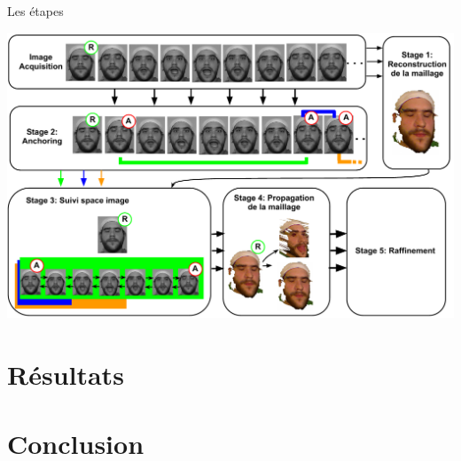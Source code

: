 \documentclass[compress,pdf,11pt,xcolor=dvipsnames]{beamer}
\begin{document}
\begin{frame}{Les étapes}
  \begin{center}
    \includegraphics[width=\textwidth]{img/projDiagram}
  \end{center}
\end{frame}


\section{Résultats}
\begin{frame}{}
\end{frame}{}


\section{Conclusion}
\end{document}
